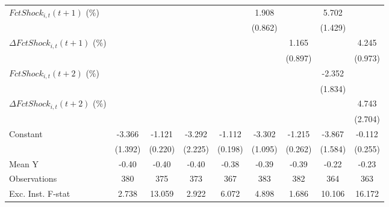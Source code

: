 {\begin{tabular}{l*{8}{c}}
\addlinespace
$ FctShock_{i,t}(t+1)$ (\%)&                     &                     &                     &                     &       1.908\sym{**} &                     &       5.702\sym{***}&                     \\
                    &                     &                     &                     &                     &     (0.862)         &                     &     (1.429)         &                     \\
\addlinespace
$ \Delta FctShock_{i,t}(t+1)$ (\%)&                     &                     &                     &                     &                     &       1.165         &                     &       4.245\sym{***}\\
                    &                     &                     &                     &                     &                     &     (0.897)         &                     &     (0.973)         \\
\addlinespace
$ FctShock_{i,t}(t+2)$ (\%)&                     &                     &                     &                     &                     &                     &      -2.352         &                     \\
                    &                     &                     &                     &                     &                     &                     &     (1.834)         &                     \\
\addlinespace
$ \Delta FctShock_{i,t}(t+2)$ (\%)&                     &                     &                     &                     &                     &                     &                     &       4.743\sym{*}  \\
                    &                     &                     &                     &                     &                     &                     &                     &     (2.704)         \\
\addlinespace
Constant            &      -3.366\sym{**} &      -1.121\sym{***}&      -3.292         &      -1.112\sym{***}&      -3.302\sym{***}&      -1.215\sym{***}&      -3.867\sym{**} &      -0.112         \\
                    &     (1.392)         &     (0.220)         &     (2.225)         &     (0.198)         &     (1.095)         &     (0.262)         &     (1.584)         &     (0.255)         \\
\midrule
Mean Y              &       -0.40         &       -0.40         &       -0.40         &       -0.38         &       -0.39         &       -0.39         &       -0.22         &       -0.23         \\
Observations        &         380         &         375         &         373         &         367         &         383         &         382         &         364         &         363         \\
Exc. Inst. F-stat   &       2.738         &      13.059         &       2.922         &       6.072         &       4.898         &       1.686         &      10.106         &      16.172         \\
\bottomrule
\end{tabular}
}
